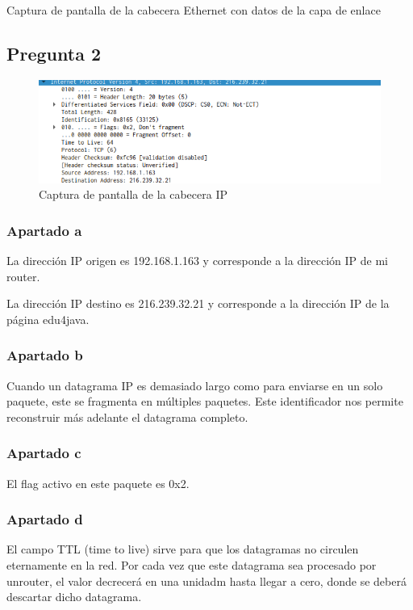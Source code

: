 \documentclass[spanish]{report} %
\begin{document}
Captura de pantalla de la cabecera Ethernet con datos de la capa de
enlace
\subsection{Pregunta 2}

\begin{figure}[h]
\begin{center}
\includegraphics[scale=.5]{../img/2.png}
\end{center}
\caption{Captura de pantalla de la cabecera IP}
\end{figure}

\subsubsection{Apartado a}
La dirección IP origen es 192.168.1.163 y corresponde a la dirección IP de mi
router.\newline

La dirección IP destino es 216.239.32.21 y corresponde a la dirección IP de la
página edu4java.

\subsubsection{Apartado b}
Cuando un datagrama IP es demasiado largo como para enviarse en un solo paquete,
este se fragmenta en múltiples paquetes. Este identificador nos permite
reconstruir más adelante el datagrama completo.

\subsubsection{Apartado c}
El flag activo en este paquete es 0x2.

\subsubsection{Apartado d}
El campo TTL (time to live) sirve para que los datagramas no circulen
eternamente en la red. Por cada vez que este datagrama sea procesado por
unrouter, el valor decrecerá en una unidadm hasta llegar a cero, donde se deberá
descartar dicho datagrama.\newline
\end{document}
